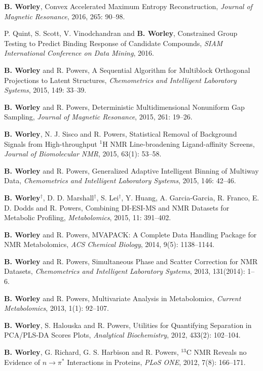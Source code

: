 \documentclass[letterpaper]{article}
\renewenvironment{itemize}{
  \begin{list}{}{
    \setlength{\leftmargin}{1.5em}
  }
}{
  \end{list}
}
\begin{document}
\begin{itemize}
 \item \textbf{B. Worley},
  Convex Accelerated Maximum Entropy Reconstruction,
  \emph{Journal of Magnetic Resonance},
  2016, 265: 90--98.

 \item P. Quint, S. Scott, V. Vinodchandran and \textbf{B. Worley},
  Constrained Group Testing to Predict Binding
  Response of Candidate Compounds,
  \emph{SIAM International Conference on Data Mining}, 2016.

 \item \textbf{B. Worley} and R. Powers,
  A Sequential Algorithm for Multiblock Orthogonal Projections
  to Latent Structures,
  \emph{Chemometrics and Intelligent Laboratory Systems},
  2015, 149: 33--39.

 \item \textbf{B. Worley} and R. Powers,
  Deterministic Multidimensional Nonuniform Gap Sampling,
  \emph{Journal of Magnetic Resonance},
  2015, 261: 19--26.

 \item \textbf{B. Worley}, N. J. Sisco and R. Powers,
  Statistical Removal of Background Signals from High-throughput $^1$H NMR
  Line-broadening Ligand-affinity Screens,
  \emph{Journal of Biomolecular NMR},
  2015, 63(1): 53--58.

 \item \textbf{B. Worley} and R. Powers,
  Generalized Adaptive Intelligent Binning of Multiway Data,
  \emph{Chemometrics and Intelligent Laboratory Systems},
  2015, 146: 42--46.

 \item \textbf{B. Worley}$^\dagger$, D. D. Marshall$^\dagger$,
  S. Lei$^\dagger$, Y. Huang, A. Garcia-Garcia, R. Franco,
  E. D. Dodds and R. Powers, Combining DI-ESI-MS and NMR Datasets for
  Metabolic Profiling,
  \emph{Metabolomics},
  2015, 11: 391--402.

 \item \textbf{B. Worley} and R. Powers,
  MVAPACK: A Complete Data Handling Package for NMR Metabolomics,
  \emph{ACS Chemical Biology},
  2014, 9(5): 1138--1144.

 \item \textbf{B. Worley} and R. Powers,
  Simultaneous Phase and Scatter Correction for NMR Datasets,
  \emph{Chemometrics and Intelligent Laboratory Systems},
  2013, 131(2014): 1--6.

 \item \textbf{B. Worley} and R. Powers,
  Multivariate Analysis in Metabolomics,
  \emph{Current Metabolomics},
  2013, 1(1): 92--107.

 \item \textbf{B. Worley}, S. Halouska and R. Powers,
  Utilities for Quantifying Separation in PCA/PLS-DA Scores Plots,
  \emph{Analytical Biochemistry},
  2012, 433(2): 102--104.

 \item \textbf{B. Worley}, G. Richard, G. S. Harbison and R. Powers,
  $^{13}$C NMR Reveals no Evidence of $n\rightarrow\pi^*$ Interactions
  in Proteins, \emph{PLoS ONE},
  2012, 7(8): 166--171.
\end{itemize}
\end{document}
